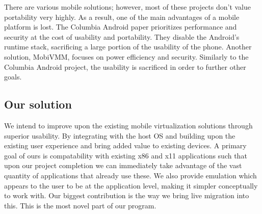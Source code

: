 There are various mobile solutions; however, most of these projects don't value portability very highly.  As a result, one of the main advantages of a mobile platform is lost.  The Columbia Android paper prioritizes performance and security at the cost of usability and portability. They disable the Android's runtime stack, sacrificing a large portion of the usability of the phone.  Another solution, MobiVMM, focuses on power efficiency and security.  Similarly to the Columbia Android project, the usability is sacrificed in order to further other goals.

\subsection{Our solution}
We intend to improve upon the existing mobile virtualization solutions through superior usability.  By integrating with the host OS and building upon the existing user experience and bring added value to existing devices.
A primary goal of ours is compatability with existing x86 and x11 applications such that upon our project completion we can immediately take advantage of the vast quantity of applications that already use these.
We also provide emulation which appears to the user to be at the application level, making it simpler conceptually to work with.
Our biggest contribution is the way we bring live migration into this.  This is the most novel part of our program.
